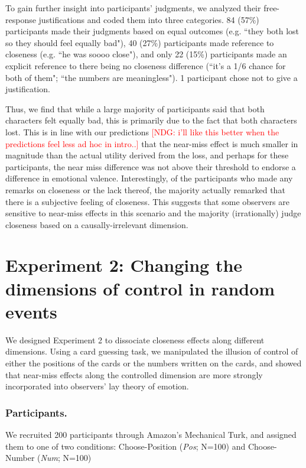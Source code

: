 \documentclass[10pt,letterpaper]{article}
\newcommand{\red}[1]{\textcolor{Red}{#1}}
\begin{document}
To gain further insight into participants' judgments, we analyzed their free-response justifications and coded them into three categories. 84 (57\%) participants made their judgments based on equal outcomes (e.g. ``they both lost so they should feel equally bad"), 40 (27\%) participants made reference to closeness (e.g. ``he was soooo close"), and only 22 (15\%) participants made an explicit reference to there being no closeness difference (``it's a 1/6 chance for both of them"; ``the numbers are meaningless"). 1 participant chose not to give a justification. 


Thus, we find that while a large majority of participants said that both characters felt equally bad, this is primarily due to the fact that both characters lost. This is in line with our predictions \red{[NDG: i'll like this better when the predictions feel less ad hoc in intro..]} that the near-miss effect is much smaller in magnitude than the actual utility derived from the loss, and perhaps for these participants, the near miss difference was not above their threshold to endorse a difference in emotional valence. Interestingly, of the participants who made any remarks on closeness or the lack thereof, the majority actually remarked that there is a subjective feeling of closeness. This suggests that some observers are sensitive to near-miss effects in this scenario and the majority (irrationally) judge closeness based on a causally-irrelevant dimension.







\section{Experiment 2: Changing the dimensions of control in random events}

We designed Experiment 2 to dissociate closeness effects along different dimensions. Using a card guessing task, we manipulated the illusion of control of either the positions of the cards or the numbers written on the cards, and showed that near-miss effects along the controlled dimension are more strongly incorporated into observers' lay theory of emotion. %

\subsubsection{Participants.} We recruited 200 participants through Amazon's Mechanical Turk, and assigned them to one of two conditions: Choose-Position (\textit{Pos}; N=100) and Choose-Number (\textit{Num}; N=100)
\end{document}
